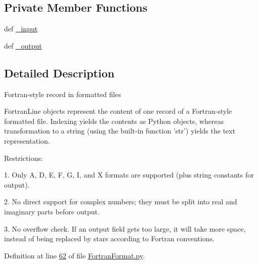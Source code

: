 \subsection*{Private Member Functions}
\begin{DoxyCompactItemize}
\item 
def \hyperlink{classpyneb_1_1utils_1_1_fortran_format_1_1_fortran_line_ac4d513ea1438afe3dc231ca29d01d476}{\-\_\-input}
\item 
def \hyperlink{classpyneb_1_1utils_1_1_fortran_format_1_1_fortran_line_a4cc783bd866ce568742c32794da6f050}{\-\_\-output}
\end{DoxyCompactItemize}


\subsection{Detailed Description}
\begin{DoxyVerb}Fortran-style record in formatted files

FortranLine objects represent the content of one record of a
Fortran-style formatted file. Indexing yields the contents as
Python objects, whereas transformation to a string (using the
built-in function 'str') yields the text representation.

Restrictions:

  1. Only A, D, E, F, G, I, and X formats are supported (plus string
     constants for output).

  2. No direct support for complex numbers; they must be split into
     real and imaginary parts before output.

  3. No overflow check. If an output field gets too large, it will
     take more space, instead of being replaced by stars according
     to Fortran conventions.
\end{DoxyVerb}
 

Definition at line \hyperlink{_fortran_format_8py_source_l00062}{62} of file \hyperlink{_fortran_format_8py_source}{Fortran\-Format.\-py}.



